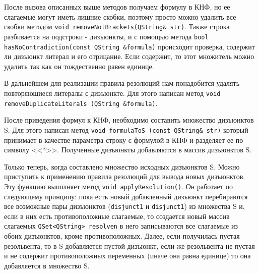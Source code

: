 \documentclass[12pt, a4paper]{article}
\begin{document}
	 \par После вызова описанных выше методов получаем формулу в КНФ, но ее слагаемые могут иметь лишние скобки, поэтому просто можно удалить все скобки методом \texttt{void removeNotBrackets(QString\& str)}. Также строка разбивается на подстроки - дизъюнкты, и с помощью метода \texttt{bool hasNoContradiction(const QString \&formula)} происходит проверка, содержит ли дизъюнкт литерал и его отрицание. Если содержит, то этот множитель можно удалить так как он тождественно равен единице.
	 \par В дальнейшем для реализации правила резолюций нам понадобится удалять повторяющиеся литералы с дизъюнкте. Для этого написан метод \texttt{void\\ removeDuplicateLiterals (QString \&formula)}. 
	 \par После приведения формул к КНФ, необходимо составить множество дизъюнктов S. Для этого написан метод  \texttt{void formulaToS (const QString\& str)} который принимает в качестве параметра строку с формулой в КНФ и разделяет ее по символу <<*>>. Полученные дизъюнкты добавляются в массив дизъюнктов S. 
	 \par Только теперь, когда составлено множество исходных дизъюнктов S. Можно приступить к применению правила резолюций для вывода новых дизъюнктов. Эту функцию выполняет метод \texttt{void applyResolution()}. Он работает по следующему принципу: пока есть новый добавленный дизъюнкт перебираются все возможные пары дизъюнктов (\texttt{disjunct1} и \texttt{disjunct1}) из множества S и, если в них есть противоположные слагаемые, то создается новый массив слагаемых \texttt{QSet<QString> resolven} в него записываются все слагаемые из обоих дизъюнктов, кроме противоположных. Далее, если получилась пустая резольвента, то в S добавляется пустой дизъюнкт, если же резольвента не пустая и не содержит противоположных переменных (иначе она равна единице) то она добавляется в множество S.
\end{document}
